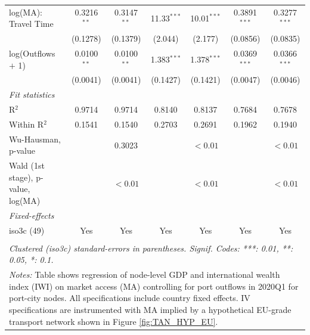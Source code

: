 \documentclass[a4paper]{article}
\begin{document}
\begin{table}[H]
{\begin{tabular}{lcccccc}
      log(MA): Travel Time                            & 0.3216$^{**}$         & 0.3147$^{**}$        & 11.33$^{***}$ & 10.01$^{***}$          & 0.3891$^{***}$  & 0.3277$^{***}$\\  
                                                         & (0.1278)              & (0.1379)             & (2.044)       & (2.177)                & (0.0856)        & (0.0835)\\   
      log(Outflows $+$ 1)                                & 0.0100$^{**}$         & 0.0100$^{**}$        & 1.383$^{***}$ & 1.378$^{***}$          & 0.0369$^{***}$  & 0.0366$^{***}$\\   
                                                         & (0.0041)              & (0.0041)             & (0.1427)      & (0.1421)               & (0.0047)        & (0.0046)\\   
     \emph{Fit statistics}\\
           R$^2$                                              & 0.9714                & 0.9714               & 0.8140        & 0.8137                 & 0.7684          & 0.7678\\  
      Within R$^2$                                       & 0.1541                & 0.1540               & 0.2703        & 0.2691                 & 0.1962          & 0.1940\\  
      Wu-Hausman, p-value                                &                       & 0.3023               &               & $<0.01$    &                 & $<0.01$  \\   
      Wald (1st stage), p-value, log(MA)           &                       & $<0.01$   &               &     $<0.01$                    &                 & $<0.01$ \\  
                                                      
     \midrule
      \emph{Fixed-effects}\\
      iso3c (49)                                         & Yes                   & Yes                  & Yes           & Yes                 & Yes             & Yes\\  
      \bottomrule \\ [-0.9em]
      \multicolumn{7}{l}{\footnotesize \emph{Clustered (iso3c) standard-errors in parentheses. Signif. Codes: ***: 0.01, **: 0.05, *: 0.1.}}\\ [0.4em]
      \multicolumn{7}{l}{\parbox{1.05\textwidth}{\footnotesize
\textit{Notes:} Table shows regression of node-level GDP and international wealth index (IWI) on market access (MA) controlling for port outflows in 2020Q1 for port-city nodes. All specifications include country fixed effects. IV specifications are instrumented with MA implied by a hypothetical EU-grade transport network shown in Figure \ref{fig:TAN_HYP_EU}. \vspace{-1mm}}}
   \end{tabular}
   }
\end{table}
\end{document}
